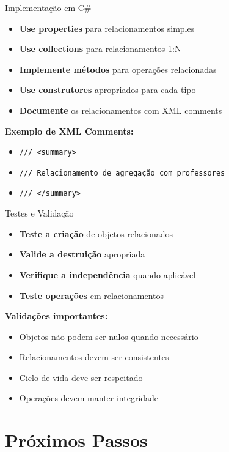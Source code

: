 \documentclass[aspectratio=169]{beamer}
\begin{document}
\begin{frame}{Implementação em C\#}
\begin{itemize}
\item \textbf{Use properties} para relacionamentos simples
\item \textbf{Use collections} para relacionamentos 1:N
\item \textbf{Implemente métodos} para operações relacionadas
\item \textbf{Use construtores} apropriados para cada tipo
\item \textbf{Documente} os relacionamentos com XML comments
\end{itemize}

\vspace{0.5cm}
\textbf{Exemplo de XML Comments:}
\begin{itemize}
\item \texttt{/// <summary>}
\item \texttt{/// Relacionamento de agregação com professores}
\item \texttt{/// </summary>}
\end{itemize}
\end{frame}

\begin{frame}{Testes e Validação}
\begin{itemize}
\item \textbf{Teste a criação} de objetos relacionados
\item \textbf{Valide a destruição} apropriada
\item \textbf{Verifique a independência} quando aplicável
\item \textbf{Teste operações} em relacionamentos
\end{itemize}

\vspace{0.5cm}
\textbf{Validações importantes:}
\begin{itemize}
\item Objetos não podem ser nulos quando necessário
\item Relacionamentos devem ser consistentes
\item Ciclo de vida deve ser respeitado
\item Operações devem manter integridade
\end{itemize}
\end{frame}

\section{Próximos Passos}
\end{document}
